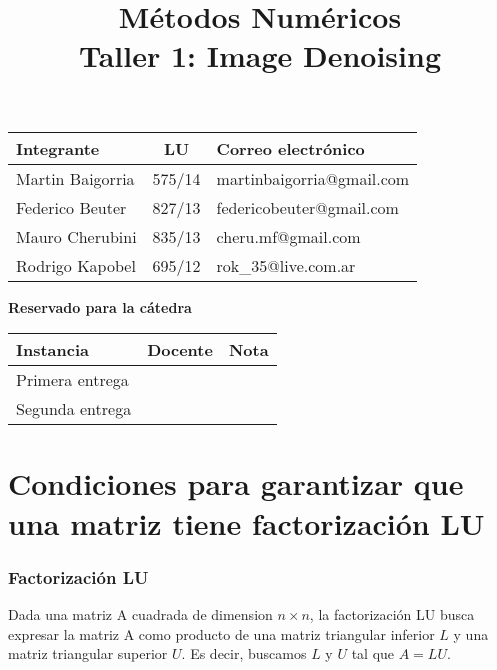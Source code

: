 \documentclass[10pt,a4paper]{article}
\title{Métodos Numéricos \\ Taller 1: Image Denoising}
\begin{document}

\maketitle

\bigskip

\begin{table}[h]
\centering
\begin{tabular}{|l l l|}
\hline
Integrante       & \multicolumn{1}{c}{LU}     & Correo electrónico        \\ \hline
Martin Baigorria & \multicolumn{1}{c}{575/14} & martinbaigorria@gmail.com \\ 
Federico Beuter & 827/13                      & federicobeuter@gmail.com \\
Mauro Cherubini & 835/13                      & cheru.mf@gmail.com \\ 
Rodrigo Kapobel & 695/12                      & rok\_35@live.com.ar \\  \hline
\end{tabular}
\end{table}

\vfill

\begin{center}
\textbf{Reservado para la cátedra}
\end{center}
\begin{table}[h]
\centering
\begin{tabular}{|l|l|l|}
\hline
Instancia       & Docente & Nota \\ \hline
Primera entrega &         &      \\ \hline
Segunda entrega &         &      \\ \hline
\end{tabular}
\end{table}

\newpage
\tableofcontents
\newpage


\section{Condiciones para garantizar que una matriz tiene factorización LU}

\subsubsection{Factorización LU}

Dada una matriz A cuadrada de dimension $n \times n$, la factorización LU busca expresar la matriz A como producto de una matriz triangular inferior $L$ y una matriz triangular superior $U$. Es decir, buscamos $L$ y $U$ tal que $A = LU$.
\end{document}
